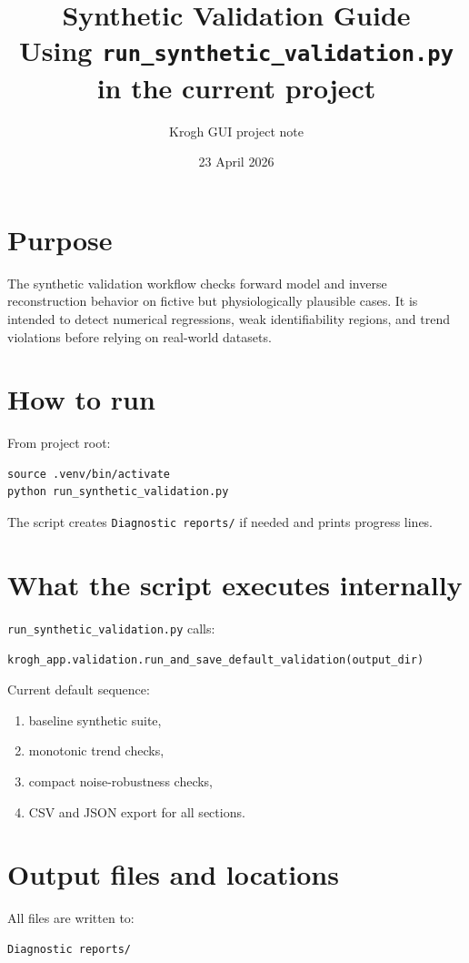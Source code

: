\documentclass[12pt,a4paper]{article}
\title{Synthetic Validation Guide\\Using \texttt{run\_synthetic\_validation.py} in the current project}
\author{Krogh GUI project note}
\date{23 April 2026}
\begin{document}
\sloppy
\maketitle
\tableofcontents

\section{Purpose}
The synthetic validation workflow checks forward model and inverse reconstruction behavior on fictive but physiologically plausible cases. It is intended to detect numerical regressions, weak identifiability regions, and trend violations before relying on real-world datasets.

\section{How to run}
From project root:
\begin{verbatim}
source .venv/bin/activate
python run_synthetic_validation.py
\end{verbatim}

The script creates \texttt{Diagnostic reports/} if needed and prints progress lines.

\section{What the script executes internally}
\texttt{run\_synthetic\_validation.py} calls:
\begin{center}
\texttt{krogh\_app.validation.run\_and\_save\_default\_validation(output\_dir)}
\end{center}

Current default sequence:
\begin{enumerate}
    \item baseline synthetic suite,
    \item monotonic trend checks,
    \item compact noise-robustness checks,
    \item CSV and JSON export for all sections.
\end{enumerate}

\section{Output files and locations}
All files are written to:
\begin{verbatim}
Diagnostic reports/
\end{verbatim}
\end{document}
